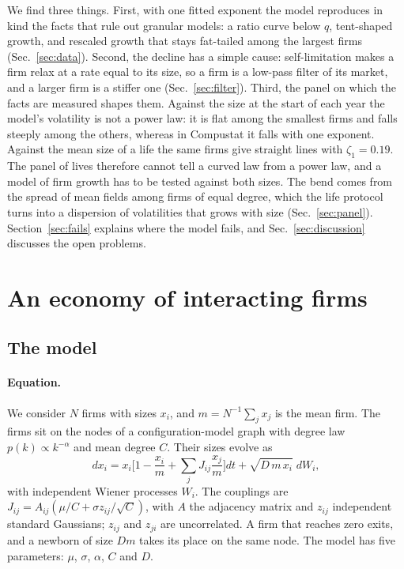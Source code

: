 \documentclass[pre,twocolumn,superscriptaddress,nofootinbib]{revtex4-2}
\begin{document}
We find three things.  First, with one fitted exponent the model reproduces in kind the facts that rule out
granular models: a ratio curve below $q$, tent-shaped growth, and rescaled growth that stays fat-tailed among the
largest firms (Sec.~\ref{sec:data}).  Second, the decline has a simple cause: self-limitation makes a firm relax at
a rate equal to its size, so a firm is a low-pass filter of its market, and a larger firm is a stiffer one
(Sec.~\ref{sec:filter}).  Third, the panel on which the facts are measured shapes them.  Against the size at the
start of each year the model's volatility is not a power law: it is flat among the smallest firms and falls steeply
among the others, whereas in Compustat it falls with one exponent.  Against the mean size of a life the same firms
give straight lines with $\zeta_1=0.19$.  The panel of lives therefore cannot tell a curved law from a power law,
and a model of firm growth has to be tested against both sizes.  The bend comes from the spread of mean fields
among firms of equal degree, which the life protocol turns into a dispersion of volatilities that grows with size
(Sec.~\ref{sec:panel}).  Section~\ref{sec:fails} explains where the model
fails, and Sec.~\ref{sec:discussion} discusses the open problems.

\section{An economy of interacting firms}
\label{sec:economy}

\subsection{The model}
\label{sec:model}

\paragraph{Equation.}  We consider $N$ firms with sizes $x_i$, and $m=N^{-1}\sum_jx_j$ is the mean firm.  The firms
sit on the nodes of a configuration-model graph with degree law $p(k)\propto k^{-\alpha}$ and mean degree $C$.
Their sizes evolve as
\begin{equation}
dx_i=x_i\Big[1-\frac{x_i}{m}+\sum_jJ_{ij}\frac{x_j}{m}\Big]dt+\sqrt{D\,m\,x_i}\;dW_i ,
\label{eq:model}
\end{equation}
with independent Wiener processes $W_i$.  The couplings are $J_{ij}=A_{ij}(\mu/C+\sigma z_{ij}/\sqrt C)$, with
$A$ the adjacency matrix and $z_{ij}$ independent standard Gaussians; $z_{ij}$ and $z_{ji}$ are uncorrelated.  A
firm that reaches zero exits, and a newborn of size $Dm$ takes its place on the same node.  The model has five
parameters: $\mu$, $\sigma$, $\alpha$, $C$ and $D$.
\end{document}
